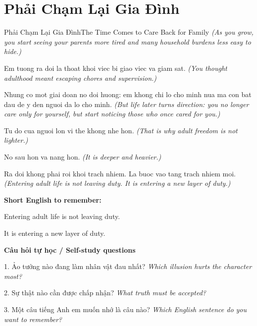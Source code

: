 \section{Phải Chạm Lại Gia Đình}
\begin{truyen}{Phải Chạm Lại Gia Đình}{The Time Comes to Care Back for Family}
\textit{(As you grow, you start seeing your parents more tired and many household burdens less easy to hide.)}

Em tuong ra doi la thoat khoi viec bi giao viec va giam sat.
\textit{(You thought adulthood meant escaping chores and supervision.)}

Nhung co mot giai doan no doi huong: em khong chi lo cho minh nua ma con bat dau de y den nguoi da lo cho minh.
\textit{(But life later turns direction: you no longer care only for yourself, but start noticing those who once cared for you.)}

Tu do cua nguoi lon vi the khong nhe hon.
\textit{(That is why adult freedom is not lighter.)}

No sau hon va nang hon.
\textit{(It is deeper and heavier.)}

\end{truyen}

\begin{baihoc}
Ra doi khong phai roi khoi trach nhiem. La buoc vao tang trach nhiem moi.
\textit{(Entering adult life is not leaving duty. It is entering a new layer of duty.)}
\end{baihoc}

\begin{ghinhoanh}
\textbf{Short English to remember:}

Entering adult life is not leaving duty.

It is entering a new layer of duty.

\end{ghinhoanh}

\begin{tuhocnhanh}
\textbf{Câu hỏi tự học / Self-study questions}

1. Ảo tưởng nào đang làm nhân vật đau nhất? \textit{Which illusion hurts the character most?}

2. Sự thật nào cần được chấp nhận? \textit{What truth must be accepted?}

3. Một câu tiếng Anh em muốn nhớ là câu nào? \textit{Which English sentence do you want to remember?}
\end{tuhocnhanh}
\ngancach

